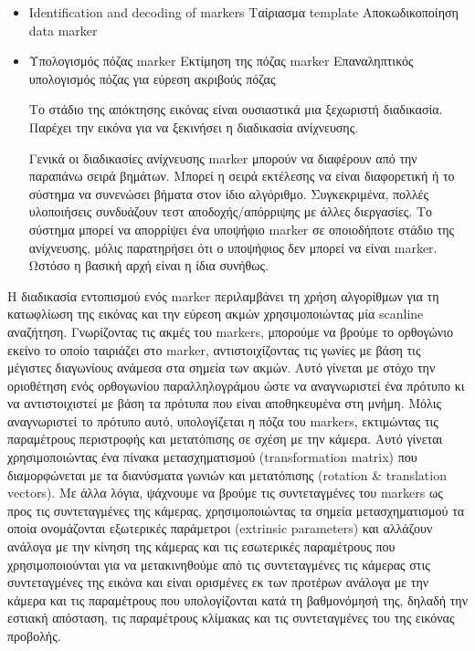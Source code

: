 \begin{itemize}
\item Identification and decoding of markers
Ταίριασμα template 
Αποκωδικοποίηση data marker
\item Υπολογισμός πόζας marker
Εκτίμηση της πόζας marker
Επαναληπτικός υπολογισμός πόζας για εύρεση ακριβούς πόζας

Το στάδιο της απόκτησης εικόνας είναι ουσιαστικά μια ξεχωριστή διαδικασία. Παρέχει την εικόνα για να ξεκινήσει η διαδικασία ανίχνευσης.

Γενικά οι διαδικασίες ανίχνευσης marker μπορούν να διαφέρουν από την παραπάνω σειρά βημάτων. Μπορεί η σειρά εκτέλεσης να είναι διαφορετική ή το σύστημα να συνενώσει βήματα στον ίδιο αλγόριθμο. Συγκεκριμένα, πολλές υλοποιήσεις συνδυάζουν τεστ αποδοχής/απόρριψης με άλλες διεργασίες. Το σύστημα μπορεί να απορρίψει ένα υποψήφιο marker σε οποιοδήποτε στάδιο της ανίχνευσης, μόλις παρατηρήσει ότι ο υποψήφιος δεν μπορεί να είναι marker. Ωστόσο η βασική αρχή είναι η ίδια συνήθως. 

\end{itemize}



Η διαδικασία εντοπισμού ενός marker περιλαμβάνει τη χρήση αλγορίθμων για τη κατωφλίωση της εικόνας και την εύρεση ακμών χρησιμοποιώντας μία scanline αναζήτηση.  Γνωρίζοντας τις ακμές του markers, μπορούμε να βρούμε το ορθογώνιο εκείνο το οποίο ταιριάζει στο marker, αντιστοιχίζοντας τις γωνίες με βάση τις μέγιστες διαγωνίους ανάμεσα στα σημεία των ακμών. Αυτό γίνεται με στόχο την οριοθέτηση ενός ορθογωνίου παραλληλογράμου ώστε να αναγνωριστεί ένα πρότυπο κι να αντιστοιχιστεί με βάση τα πρότυπα που είναι αποθηκευμένα στη μνήμη. Μόλις αναγνωριστεί το πρότυπο αυτό, υπολογίζεται η πόζα του markers, εκτιμώντας τις παραμέτρους περιστροφής και μετατόπισης σε σχέση με την κάμερα. Αυτό γίνεται χρησιμοποιώντας ένα πίνακα μετασχηματισμού (transformation matrix) που διαμορφώνεται με τα διανύσματα γωνιών και μετατόπισης (rotation \& translation vectors). Με άλλα λόγια, ψάχνουμε να βρούμε τις συντεταγμένες του markers ως προς τις συντεταγμένες της κάμερας, χρησιμοποιώντας τα σημεία μετασχηματισμού τα οποία ονομάζονται εξωτερικές παράμετροι (extrinsic parameters) και αλλάζουν ανάλογα με την κίνηση της κάμερας και τις εσωτερικές παραμέτρους που χρησιμοποιούνται για να μετακινηθούμε από τις συντεταγμένες τις κάμερας στις συντεταγμένες της εικόνα και είναι ορισμένες εκ των προτέρων ανάλογα με την κάμερα και τις παραμέτρους που υπολογίζονται κατά τη βαθμονόμησή της, δηλαδή την εστιακή απόσταση, τις παραμέτρους κλίμακας και τις συντεταγμένες του της εικόνας προβολής.

